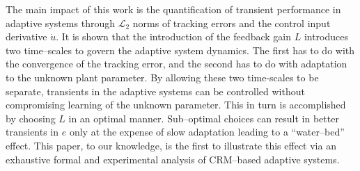 \documentclass[10pt,journal]{IEEEtran}
\theoremstyle{plain}%
\theoremstyle{definition}
\begin{document}
The main impact of this work is the quantification of transient performance in adaptive systems through $\mathcal L_2$ norms of tracking errors and the control input derivative $\dot u$. It is shown that the introduction of the feedback gain $L$ introduces two time--scales to govern the adaptive system dynamics. The first has to do with the convergence of the tracking error, and the second has to do with adaptation to the unknown plant parameter. By allowing these two time-scales to be separate, transients in the adaptive systems can be controlled without compromising learning of the unknown parameter. This in turn is accomplished by choosing $L$ in an optimal manner. Sub--optimal choices can result in better transients in $e$ only at the expense of slow adaptation leading to a ``water--bed'' effect. This paper, to our knowledge, is the first to illustrate this effect via an exhaustive formal and experimental analysis of CRM--based adaptive systems.




% 

\appendices
\end{document}
